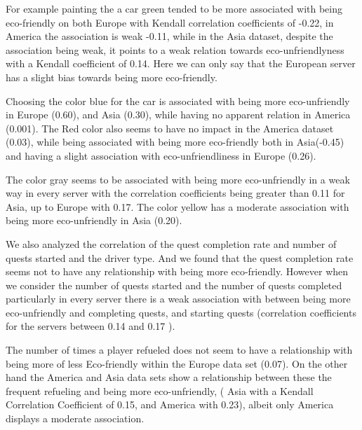 \documentclass[preprint,authoryear,12pt]{elsarticle}
\begin{document}
For example painting the a car green tended to be more associated with being eco-friendly on both Europe with Kendall correlation coefficients of -0.22, in America the association is weak -0.11, while in the Asia dataset, despite the association being weak, it points to a weak relation towards eco-unfriendlyness with a Kendall coefficient of 0.14. Here we can only say that the European server has a slight bias towards being more eco-friendly.

Choosing the color blue for the car is associated with being more eco-unfriendly in Europe (0.60), and Asia (0.30), while having no apparent relation in America (0.001).
The Red color also seems to have no impact in the America dataset (0.03), while being associated with being more eco-friendly both in Asia(-0.45) and having a slight association with eco-unfriendliness in Europe (0.26).

The color gray seems to be associated with being more eco-unfriendly in a weak way in every server with the correlation coefficients being greater than 0.11 for Asia, up to Europe with 0.17. The color yellow has a moderate association with being more eco-unfriendly in Asia (0.20).

%


We also analyzed the correlation of the quest completion rate and number of quests started and the driver type. And we found that the quest completion rate seems not to have any relationship with being more eco-friendly. 
However when we consider the number of quests started and the number of quests completed 
particularly in every server there is a weak association with between being more eco-unfriendly and completing quests, and starting quests (correlation coefficients for the servers between 0.14 and 0.17 ). 


The number of times a player refueled does not seem to have a relationship with being more of less Eco-friendly within the Europe data set (0.07). On the other hand the America and Asia data sets show a relationship between these the frequent refueling and being more eco-unfriendly, ( Asia with a Kendall Correlation Coefficient of 0.15, and America with 0.23), albeit only America displays a moderate association.
\end{document}
